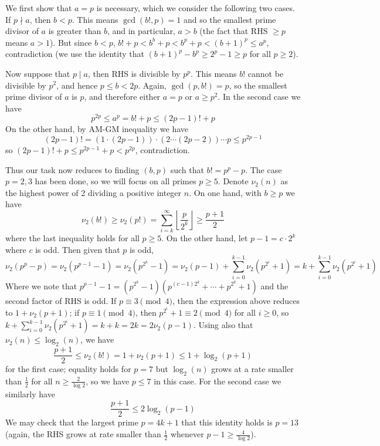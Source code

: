 \documentclass[11pt,a4paper]{article}
\begin{document}
\begin{enumerate}
    	We first show that $a=p$ is necessary, which we consider the following two cases. 
    	If $p\nmid a$, then $b < p$. This means $\gcd(b!, p)=1$ and so the smallest prime divisor of $a$ is greater than $b$, 
    	and in particular, $a > b$ 
    	(the fact that RHS $\ge p$ means $a > 1$). 
    	But since $b < p$, $b! + p < b^b + p < b^p + p< (b + 1)^p \le a^p$, contradiction 
    	(we use the identity that $(b+1)^p - b^p\ge 2^p - 1\ge p$ for all $p\ge 2$). 
    	
    	Now suppose that $p\mid a$, then RHS is divisible by $p^p$. 
    	This means $b!$ cannot be divisible by $p^2$, 
        and hence $p\le b < 2p$. 
        Again, $\gcd(p, b!) = p$, so the smallest prime divisor of $a$ is $p$, and therefore 
        either $a=p$ or $a\ge p^2$. 
        In the second case we have 
        \[
        p^{2p} \le  a^p = b! + p \le (2p - 1)! + p
        \]
        On the other hand, by AM-GM inequality we have 
        \[
        (2p - 1)! = (1\cdot (2p - 1))\cdot (2\cdots (2p-2))\cdots  p\le p^{2p-1}
        \]
        so $(2p - 1)! + p \le p^{2p-1} + p < p^{2p}$, contradiction. 
        
        Thus our task now reduces to finding $(b, p)$ such that $b! = p^p - p$. 
        The case $p=2, 3$ has been done, so we will focus on all primes $p\ge 5$. 
        Denote $\nu_2(n)$ as the highest power of 2 dividing a positive integer $n$. 
        On one hand, with $b\ge p$ we have 
        \[
        \nu_2(b!)\ge \nu_2(p!) = \sum_{i=k}^{\infty}\left\lfloor\frac{p}{2^k}\right\rfloor \ge \frac{p + 1}{2}
        \]
        where the last inequality holds for all $p\ge 5$. 
        On the other hand, let $p - 1 = c\cdot 2^k$ where $c$ is odd. Then given that $p$ is odd, 
        \[
        \nu_2(p^p-p)
        =\nu_2(p^{p-1} - 1)
        =\nu_2(p^{2^k} - 1)
        =\nu_2(p - 1) + \sum_{i=0}^{k - 1}\nu_2(p^{2^i} + 1)
        =k + \sum_{i=0}^{k - 1}\nu_2(p^{2^i} + 1)
        \]
        Where we note that $p^{p-1} - 1=(p^{2^k} - 1)(p^{(c-1)2^k} + \cdots + p^{2^k}+1)$ and the second factor of RHS is odd. 
        If $p \equiv 3\pmod{4}$, then the expression above reduces to $1 + \nu_2(p + 1)$; 
        if $p\equiv 1\pmod{4}$, then $p^{2^i} + 1\equiv 2\pmod{4}$ for all $i\ge 0$, 
        so $k + \sum_{i=0}^{k - 1}\nu_2(p^{2^i} + 1) = k + k = 2k = 2\nu_2(p - 1)$. 
        Using also that $\nu_2(n)\le \log_2(n)$, we have 
        \[
        \frac{p + 1}{2} \le \nu_2(b!) = 1 + \nu_2(p + 1) \le 1 + \log_2(p + 1)
        \]
        for the first case; 
        equality holds for $p=7$ but $\log_2(n)$ grows at a rate smaller than $\frac 12$ for all $n\ge \frac{2}{\log 2}$, 
        so we have $p\le 7$ in this case. 
        For the second case we similarly have 
        \[
        \frac{p+1}{2}\le 2\log_2(p - 1)
        \]
        We may check that the largest prime $p=4k+1$ that this identity holds is $p=13$ 
        (again, the RHS grows at rate smaller than $\frac 12$ whenever $p - 1\ge \frac{4}{\log 2}$). 
        

\end{enumerate}
\end{document}
